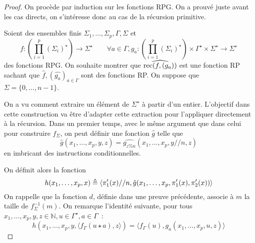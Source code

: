 \begin{proof}
  On procède par induction sur les fonctions RPG. On a prouvé juste avant les
  cas directs, on s'intéresse donc au cas de la récursion primitive.

  Soient des ensembles finis $\Sigma_1,\ldots,\Sigma_p,\Gamma,\Sigma$ et
  \[f : \left(\prod_{i = 1}^p (\Sigma_i)^\star\right)\to \Sigma^\star\qquad
  \forall a \in \Gamma, g_a : \left(\prod_{i = 1}^p
  (\Sigma_i)^\star\right)\times\Gamma^\star\times\Sigma^\star
  \to \Sigma^\star\]
  des fonctions RPG. On souhaite montrer que $\widehat{\operatorname{rec}(f,(g_a))}$ est
  une fonction RP sachant que $\hat f, (\hat{g_a})_{a\in \Gamma}$ sont
  des fonctions RP. On suppose que $\Sigma = \{0,\ldots,n-1\}$.

  On a vu comment extraire un élément de $\Sigma^\star$ à partir d'un
  entier. L'objectif dans cette construction va être d'adapter cette
  extraction pour l'appliquer directement à la récursion. Dans un premier
  temps, avec le même argument que dans celui pour construire $f_\Sigma$,
  on peut définir une fonction $\hat g$ telle que
  \[\hat g (x_1,\ldots,x_p,y,z) = \widehat{g_{z\% n}}(x_1,\ldots,x_p,y//n,z)\]
  en imbricant des instructions conditionnelles.

  On définit alors la fonction
  \[h(x_1,\ldots,x_p,x) \triangleq
  \langle\pi'_1(x) // n,\hat g(x_1,\ldots,x_p,\pi'_1(x),\pi'_2(x))\rangle\]
  On rappelle que la fonction $d$, définie dans une preuve précédente, associe
  à $m$ la taille de $f_\Sigma^{-1}(m)$. On remarque l'identité suivante, pour
  tous $x_1,\ldots,x_p,y,z\in \mathbb N, u \in \Gamma^\star, a \in \Gamma$~:
  \[h(x_1,\ldots,x_p,y,\langle f_\Gamma(u\star a),z\rangle) =
  \langle f_\Gamma(u),g_a(x_1,\ldots,x_p,u,z)\rangle\]


\end{proof}
